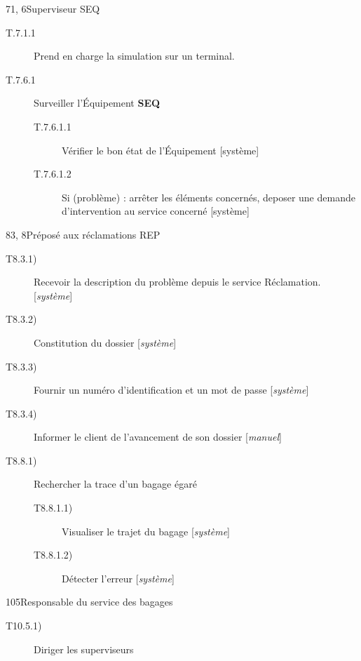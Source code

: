 \hspace{1cm}

\dta
{7}{1, 6}{Superviseur}
{SEQ}
{
\begin{description}
	\item[T.7.1.1] Prend en charge la simulation sur un terminal.
	\item[T.7.6.1] Surveiller l'Équipement \textbf{SEQ}
	\begin{description}
		\item[T.7.6.1.1] Vérifier le bon état de l'Équipement [système]
		\item[T.7.6.1.2] Si (problème) : arrêter les éléments concernés, deposer une demande d'intervention au service concerné [système]
	\end{description}
\end{description}
}

\hspace{1cm}

\dta
{8}{3, 8}{Préposé aux réclamations}
{REP}
{
\begin{description}
	\item [T8.3.1)] Recevoir la description du problème depuis le service \og Réclamation\fg. [\textsl{système}]
	\item [T8.3.2)] Constitution du dossier [\textsl{système}] 
	\item [T8.3.3)] Fournir un numéro d'identification et un mot de passe [\textsl{système}]
	\item [T8.3.4)] Informer le client de l'avancement de son dossier [\textsl{manuel}]
	\item [T8.8.1)] Rechercher la trace d'un bagage égaré
	\begin{description}
		\item [T8.8.1.1)] Visualiser le trajet du bagage [\textsl{système}]
		\item [T8.8.1.2)] Détecter l'erreur [\textsl{système}]
	\end{description}
\end{description}
}

\hspace{1cm}

\dta
{10}{5}{Responsable du service des bagages}{~}
{
\begin{description}
	\item [T10.5.1)] Diriger les superviseurs
\end{description}
}


